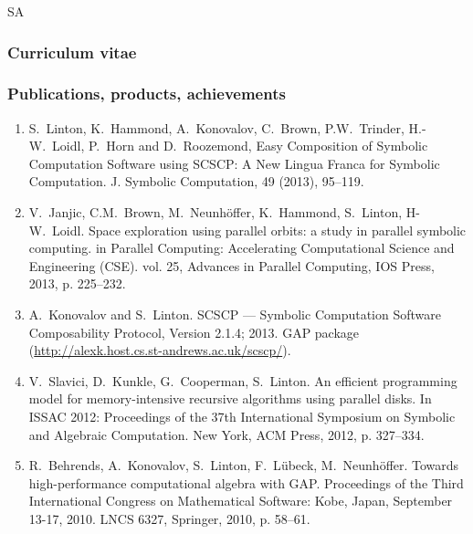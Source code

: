 \begin{sitedescription}{SA}
\subsubsection*{Curriculum vitae}





%


\subsubsection*{Publications, products, achievements}

\begin{enumerate}
\item 
S.~Linton, K.~Hammond, A.~Konovalov, C.~Brown, P.W.~Trinder, H.-W.~Loidl, 
P.~Horn and D.~Roozemond, Easy Composition of Symbolic Computation Software using 
SCSCP: A New Lingua Franca for Symbolic Computation.
J. Symbolic Computation, 49 (2013), 95--119.
\item
V.~Janjic, C.M.~Brown, M.~Neunh{\"o}ffer, K.~Hammond, S.~Linton, H-W.~Loidl. 
Space exploration using parallel orbits: a study in parallel symbolic computing.
in Parallel Computing: Accelerating Computational Science and Engineering (CSE). 
vol. 25, Advances in Parallel Computing, IOS Press, 2013, p. 225--232.
\item 
A.~Konovalov and S.~Linton. 
SCSCP --- Symbolic Computation Software Composability Protocol, 
Version 2.1.4; 2013. GAP package (\url{http://alexk.host.cs.st-andrews.ac.uk/scscp/}).
\item
V.~Slavici, D.~Kunkle, G.~Cooperman, S.~Linton. 
An efficient programming model for memory-intensive recursive 
algorithms using parallel disks. In ISSAC 2012: Proceedings of 
the 37th International Symposium on Symbolic and Algebraic Computation. 
New York, ACM Press, 2012, p. 327--334.
\item 
R.~Behrends, A.~Konovalov, S.~Linton, F.~L{\"u}beck, M.~Neunh{\"o}ffer.
Towards high-performance computational algebra with GAP.
Proceedings of the Third International Congress on Mathematical Software: 
Kobe, Japan, September 13-17, 2010. LNCS 6327, Springer, 2010, p. 58--61.

\end{enumerate}


\end{sitedescription}
